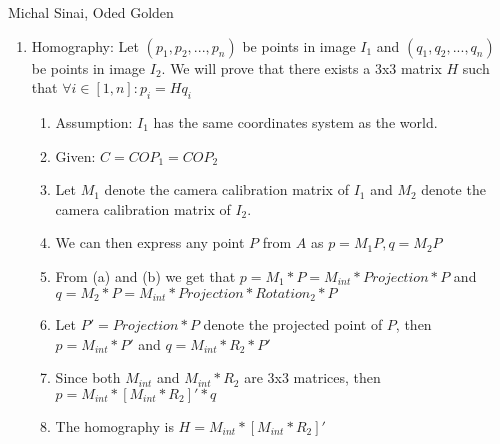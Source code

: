\documentclass{article}
\begin{document}
\newline  Michal Sinai, Oded Golden
\begin{enumerate}
\item Homography: Let $(p_1,p_2,...,p_n)$ be points in image $I_1$ and $(q_1,q_2,...,q_n)$ be points in image $I_2$. We will prove that there exists a 3x3 matrix $H$ such that $\forall i\in [1,n]: p_i=Hq_i$
\begin{enumerate}
\item Assumption: $I_1$ has the same coordinates system as the world.
\item Given: $C=COP_1=COP_2$
\item Let $M_1$ denote the camera calibration matrix of $I_1$ and $M_2$ denote the camera calibration matrix of $I_2$.
\item We can then express any point $P$ from $A$ as $p=M_1P, q=M_2P$
\item From (a) and (b) we get that $p=M_1*P=M_{int}*Projection*P$ and $q=M_2*P=M_{int}*Projection*Rotation_2*P$
\item Let $P'=Projection*P$ denote the projected point of $P$, then $p=M_{int}*P'$ and $q=M_{int}*R_2*P'$
\item Since both $M_{int}$ and $M_{int}*R_2$ are 3x3 matrices, then $p=M_{int}*[M_{int}*R_2]'*q$
\item The homography is $H=M_{int}*[M_{int}*R_2]'$
\end{enumerate}
\end{enumerate}
\end{document}

